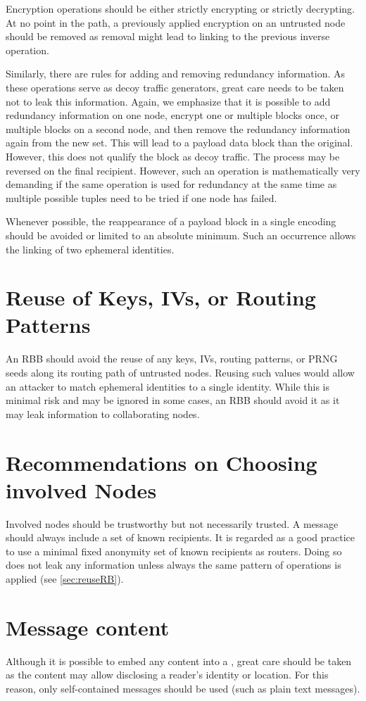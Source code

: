 Encryption operations should be either strictly encrypting or strictly decrypting. At no point in the path, a previously applied encryption on an untrusted node should be removed as removal might lead to linking to the previous inverse operation.

Similarly, there are rules for adding and removing redundancy information. As these operations serve as decoy traffic generators, great care needs to be taken not to leak this information. Again, we emphasize that it is possible to add redundancy information on one node, encrypt one or multiple blocks once, or multiple blocks on a second node, and then remove the redundancy information again from the new set. This will lead to a payload data block than the original. However, this does not qualify the block as decoy traffic. The process may be reversed on the final recipient. However, such an operation is mathematically very demanding if the same operation is used for redundancy at the same time as multiple possible tuples need to be tried if one node has failed.

Whenever possible, the reappearance of a payload block in a single encoding should be avoided or limited to an absolute minimum. Such an occurrence allows the linking of two ephemeral identities.

\section{Reuse of Keys, IVs, or Routing Patterns}
An RBB should avoid the reuse of any keys, IVs, routing patterns, or PRNG seeds along its routing path of untrusted nodes. Reusing such values would allow an attacker to match ephemeral identities to a single identity. While this is minimal risk and may be ignored in some cases, an RBB should avoid it as it may leak information to collaborating nodes.

\section{Recommendations on Choosing involved Nodes}
Involved nodes should be trustworthy but not necessarily trusted. A message should always include a set of known recipients. It is regarded as a good practice to use a minimal fixed anonymity set of known recipients as routers. Doing so does not leak any information unless always the same pattern of operations is applied (see \cref{sec:reuseRB}).

\section{Message content}
Although it is possible to embed any content into a \VortexMessage, great care should be taken as the content may allow disclosing a reader's identity or location. For this reason, only self-contained messages should be used (such as plain text messages).

